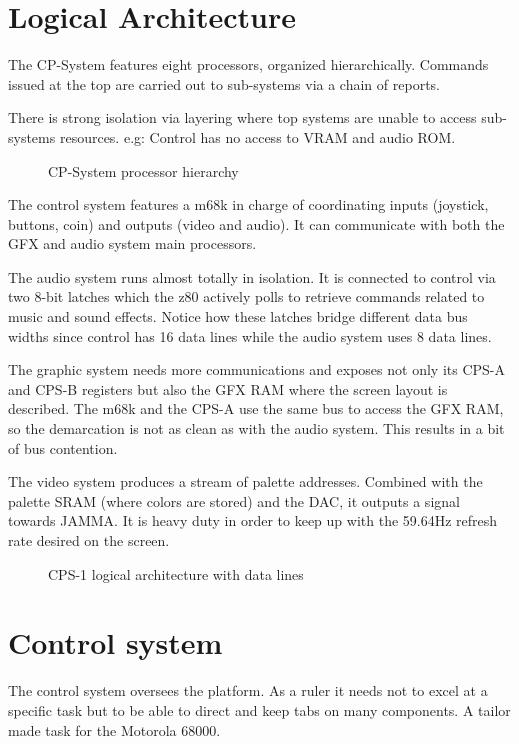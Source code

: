 \section{Logical Architecture}
The CP-System features eight processors, organized hierarchically. Commands issued at the top are carried out to sub-systems via a chain of reports. 

There is strong isolation via layering where top systems are unable to access sub-systems resources. e.g: Control has no access to VRAM and audio ROM.

\begin{figure}[H]
  \caption*{CP-System processor hierarchy}
  \end{figure}


The control system features a m68k in charge of coordinating inputs (joystick, buttons, coin) and outputs (video and audio). It can communicate with both the GFX and audio system main processors.

The audio system runs almost totally in isolation. It is connected to control via two 8-bit latches which the z80 actively polls to retrieve commands related to music and sound effects. Notice how these latches bridge different data bus widths since control has 16 data lines while the audio system uses 8 data lines.

The graphic system needs more communications and exposes not only its CPS-A and CPS-B registers but also the GFX RAM where the screen layout is described. The m68k and the CPS-A use the same bus to access the GFX RAM, so the demarcation is not as clean as with the audio system. This results in a bit of bus contention.  

The video system produces a stream of palette addresses. Combined with the palette SRAM (where colors are stored) and the DAC, it outputs a signal towards JAMMA. It is heavy duty in order to keep up with the 59.64Hz refresh rate desired on the screen.

\begin{figure}[H]
  \caption*{CPS-1 logical architecture with data lines}
  \label{cps1_arch}
  \end{figure}


\section{Control system}
The control system oversees the platform. As a ruler it needs not to excel at a specific task but to be able to direct and keep tabs on many components. A tailor made task for the Motorola 68000.


